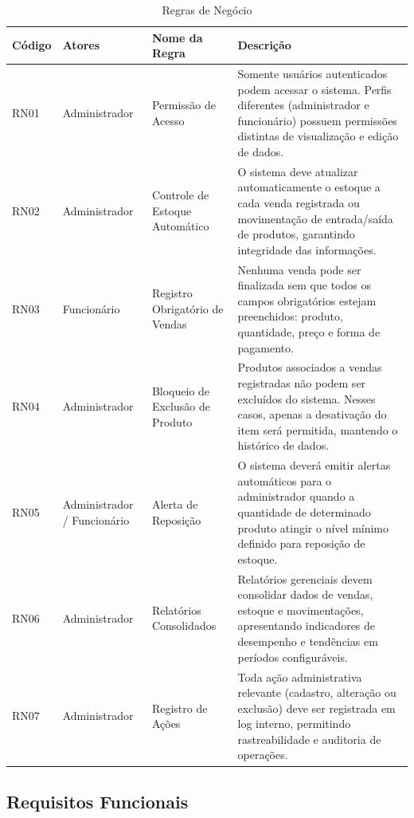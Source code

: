 \begin{table}[H]
\centering
\caption{Regras de Negócio}
\label{tab:regras-negocio}
\begin{tabular}{|p{2cm}|p{3cm}|p{4cm}|p{6.5cm}|}
\hline
\textbf{Código} & \textbf{Atores} & \textbf{Nome da Regra} & \textbf{Descrição} \\ \hline
RN01 & Administrador & Permissão de Acesso & Somente usuários autenticados podem acessar o sistema. Perfis diferentes (administrador e funcionário) possuem permissões distintas de visualização e edição de dados. \\ \hline
RN02 & Administrador & Controle de Estoque Automático & O sistema deve atualizar automaticamente o estoque a cada venda registrada ou movimentação de entrada/saída de produtos, garantindo integridade das informações. \\ \hline
RN03 & Funcionário & Registro Obrigatório de Vendas & Nenhuma venda pode ser finalizada sem que todos os campos obrigatórios estejam preenchidos: produto, quantidade, preço e forma de pagamento. \\ \hline
RN04 & Administrador & Bloqueio de Exclusão de Produto & Produtos associados a vendas registradas não podem ser excluídos do sistema. Nesses casos, apenas a desativação do item será permitida, mantendo o histórico de dados. \\ \hline
RN05 & Administrador / Funcionário & Alerta de Reposição & O sistema deverá emitir alertas automáticos para o administrador quando a quantidade de determinado produto atingir o nível mínimo definido para reposição de estoque. \\ \hline
RN06 & Administrador & Relatórios Consolidados & Relatórios gerenciais devem consolidar dados de vendas, estoque e movimentações, apresentando indicadores de desempenho e tendências em períodos configuráveis. \\ \hline
RN07 & Administrador & Registro de Ações & Toda ação administrativa relevante (cadastro, alteração ou exclusão) deve ser registrada em log interno, permitindo rastreabilidade e auditoria de operações. \\ \hline
\end{tabular}
\end{table}

\vspace{-0.5cm} %

\subsection{Requisitos Funcionais}

